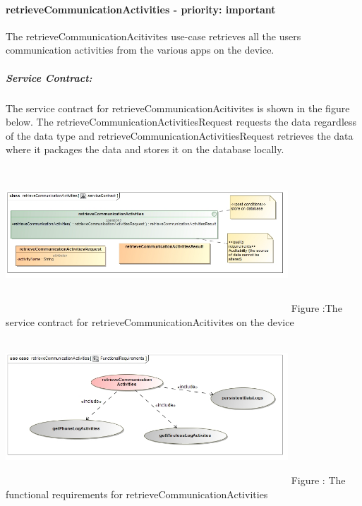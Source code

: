 \documentclass[hidelinks, 12pt, oneside]{article}
\begin{document}
		\paragraph{retrieveCommunicationActivities - priority: important}
		The retrieveCommunicationAcitivites use-case retrieves all the users communication activities from 		the various apps on the device.\newline
		\subparagraph{Service Contract:}
		The service contract for retrieveCommunicationAcitivites is shown in the figure below. The 					retrieveCommunicationActivitiesRequest requests the data regardless of the data type and 		retrieveCommunicationActivitiesRequest retrieves the data where it packages the data and stores it on the database locally.\newline\newline	
	\includegraphics[width=400px,height=220px]{img/serviceContractRetrieveCommunicationActivities.jpg}
		Figure :The service contract for retrieveCommunicationAcitivites on the device\newline
	\includegraphics[width=400px,height=220px]{img/functionalRequirementsRetrieveCommunicationActivities.jpg}
		Figure : The functional requirements for retrieveCommunicationActivities\newline
		
			\newpage
\end{document}
